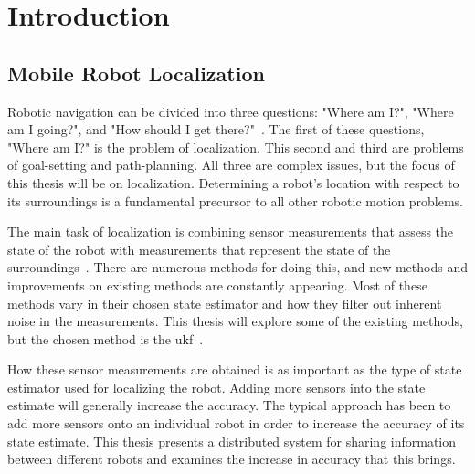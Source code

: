 \documentclass[thesis.tex]{subfile}
\begin{document}
\chapter{Introduction} \label{ch:Introduction}
\section{Mobile Robot Localization} %
Robotic navigation can be divided into three questions: "Where am I?", "Where am I going?", and "How should I get there?"~\cite{Leonard1991}. The first of these questions, "Where am I?" is the problem of localization. This second and third are problems of goal-setting and path-planning. All three are complex issues, but the focus of this thesis will be on localization. Determining a robot's location with respect to its surroundings is a fundamental precursor to all other robotic motion problems.

The main task of localization is combining sensor measurements that assess the state of the robot with measurements that represent the state of the surroundings~\cite{Roumeliotis2002}. There are numerous methods for doing this, and new methods and improvements on existing methods are constantly appearing. Most of these methods vary in their chosen state estimator and how they filter out inherent noise in the measurements. This thesis will explore some of the existing methods, but the chosen method is the \gls{ukf}~\cite{Julier1997}.

How these sensor measurements are obtained is as important as the type of state estimator used for localizing the robot. Adding more sensors into the state estimate will generally increase the accuracy. The typical approach has been to add more sensors onto an individual robot in order to increase the accuracy of its state estimate. This thesis presents a distributed system for sharing information between different robots and examines the increase in accuracy that this brings.
\end{document}
